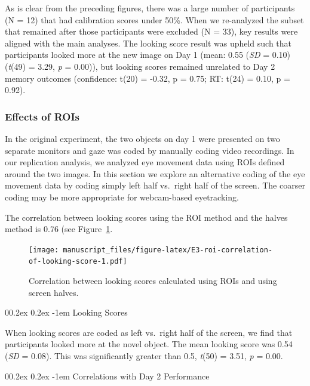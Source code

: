 \documentclass[
  man,floatsintext]{apa6}
\makeatletter
\let\oldparagraph\paragraph
\renewcommand{\paragraph}[1]{\oldparagraph{#1}\mbox{}}
\renewcommand{\paragraph}{\@startsection{paragraph}{4}{\parindent}%
  {0\baselineskip \@plus 0.2ex \@minus 0.2ex}%
  {-1em}%
  {\normalfont\normalsize\bfseries\itshape\typesectitle}}
\makeatother
\begin{document}
As is clear from the preceding figures, there was a large number of participants (N = 12) that had calibration scores under 50\%. When we re-analyzed the subset that remained after those participants were excluded (N = 33), key results were aligned with the main analyses. The looking score result was upheld such that participants looked more at the new image on Day 1 (mean: 0.55 (\emph{SD} = 0.10) (\emph{t}(49) = 3.29, \emph{p} = 0.00)), but looking scores remained unrelated to Day 2 memory outcomes (confidence: t(20) = -0.32, p = 0.75; RT: t(24) = 0.10, p = 0.92).

\subsubsection{Effects of ROIs}\label{effects-of-rois}

In the original experiment, the two objects on day 1 were presented on two separate monitors and gaze was coded by manually coding video recordings. In our replication analysis, we analyzed eye movement data using ROIs defined around the two images. In this section we explore an alternative coding of the eye movement data by coding simply left half vs.~right half of the screen. The coarser coding may be more appropriate for webcam-based eyetracking.

The correlation between looking scores using the ROI method and the halves method is 0.76 (see Figure~\ref{fig:E3-roi-correlation-of-looking-score}.

\begin{figure}
\centering
\texttt{[image: manuscript\_files/figure-latex/E3-roi-correlation-of-looking-score-1.pdf]}
\caption{\label{fig:E3-roi-correlation-of-looking-score}Correlation between looking scores calculated using ROIs and using screen halves.}
\end{figure}

\paragraph{Looking Scores}\label{looking-scores}

When looking scores are coded as left vs.~right half of the screen, we find that participants looked more at the novel object. The mean looking score was 0.54 (\emph{SD} = 0.08). This was significantly greater than 0.5, \emph{t}(50) = 3.51, \emph{p} = 0.00.

\paragraph{Correlations with Day 2 Performance}\label{correlations-with-day-2-performance}
\end{document}
